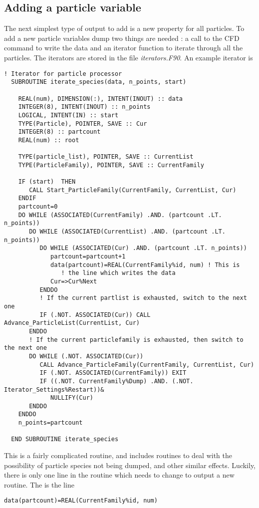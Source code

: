 \documentclass[12pt,a4paper]{article}
\newcommand{\simpleboxverbatim}{\begin{Verbatim}[obeytabs=true,frame=single,
  framerule=0.5mm,rulecolor=\color{warwickmid},formatcom=\color{black}]}
\begin{document}
\subsection{Adding a particle variable}
The next simplest type of output to add is a new property for all particles. To
add a new particle variables dump two things are needed : a call to the CFD
command to write the data and an iterator function to iterate through all the
particles. The iterators are stored in the file {\it iterators.F90}. An example
iterator is

\simpleboxverbatim
  ! Iterator for particle processor
  SUBROUTINE iterate_species(data, n_points, start)

    REAL(num), DIMENSION(:), INTENT(INOUT) :: data
    INTEGER(8), INTENT(INOUT) :: n_points
    LOGICAL, INTENT(IN) :: start
    TYPE(Particle), POINTER, SAVE :: Cur
    INTEGER(8) :: partcount
    REAL(num) :: root

    TYPE(particle_list), POINTER, SAVE :: CurrentList
    TYPE(ParticleFamily), POINTER, SAVE :: CurrentFamily

    IF (start)  THEN
       CALL Start_ParticleFamily(CurrentFamily, CurrentList, Cur)
    ENDIF
    partcount=0
    DO WHILE (ASSOCIATED(CurrentFamily) .AND. (partcount .LT. n_points))
       DO WHILE (ASSOCIATED(CurrentList) .AND. (partcount .LT. n_points))
          DO WHILE (ASSOCIATED(Cur) .AND. (partcount .LT. n_points))
             partcount=partcount+1
             data(partcount)=REAL(CurrentFamily%id, num) ! This is
                ! the line which writes the data
             Cur=>Cur%Next
          ENDDO
          ! If the current partlist is exhausted, switch to the next one
          IF (.NOT. ASSOCIATED(Cur)) CALL Advance_ParticleList(CurrentList, Cur)
       ENDDO
       ! If the current particlefamily is exhausted, then switch to the next one
       DO WHILE (.NOT. ASSOCIATED(Cur))
          CALL Advance_ParticleFamily(CurrentFamily, CurrentList, Cur)
          IF (.NOT. ASSOCIATED(CurrentFamily)) EXIT
          IF ((.NOT. CurrentFamily%Dump) .AND. (.NOT. Iterator_Settings%Restart))&
             NULLIFY(Cur)
       ENDDO
    ENDDO
    n_points=partcount

  END SUBROUTINE iterate_species
\end{Verbatim}

This is a fairly complicated routine, and includes routines to deal with the
possibility of particle species not being dumped, and other similar
effects. Luckily, there is only one line in the routine which needs to change
to output a new routine. The is the line
\simpleboxverbatim
             data(partcount)=REAL(CurrentFamily%
\end{Verbatim}
\end{document}
